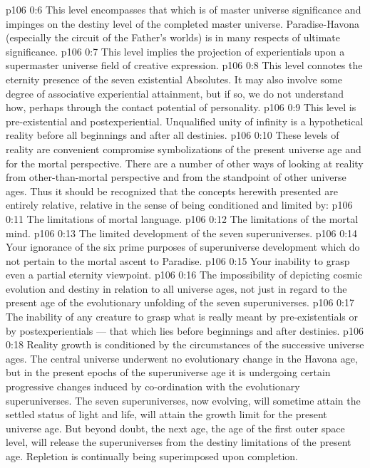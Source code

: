 \vs p106 0:6 \pc {}\bibnobreakspace {} This level encompasses that which is of master universe significance and impinges on the destiny level of the completed master universe. Paradise\hyp{}Havona (especially the circuit of the Father’s worlds) is in many respects of ultimate significance.
\vs p106 0:7 \pc {}\bibnobreakspace {} This level implies the projection of experientials upon a supermaster universe field of creative expression.
\vs p106 0:8 \pc {}\bibnobreakspace {} This level connotes the eternity presence of the seven existential Absolutes. It may also involve some degree of associative experiential attainment, but if so, we do not understand how, perhaps through the contact potential of personality.
\vs p106 0:9 \pc {}\bibnobreakspace {} This level is pre\hyp{}existential and postexperiential. Unqualified unity of infinity is a hypothetical reality before all beginnings and after all destinies.
\vs p106 0:10 \pc These levels of reality are convenient compromise symbolizations of the present universe age and for the mortal perspective. There are a number of other ways of looking at reality from other\hyp{}than\hyp{}mortal perspective and from the standpoint of other universe ages. Thus it should be recognized that the concepts herewith presented are entirely relative, relative in the sense of being conditioned and limited by:
\vs p106 0:11 \pc {}\bibnobreakspace The limitations of mortal language.
\vs p106 0:12 \pc {}\bibnobreakspace The limitations of the mortal mind.
\vs p106 0:13 \pc {}\bibnobreakspace The limited development of the seven superuniverses.
\vs p106 0:14 \pc {}\bibnobreakspace Your ignorance of the six prime purposes of superuniverse development which do not pertain to the mortal ascent to Paradise.
\vs p106 0:15 \pc {}\bibnobreakspace Your inability to grasp even a partial eternity viewpoint.
\vs p106 0:16 \pc {}\bibnobreakspace The impossibility of depicting cosmic evolution and destiny in relation to all universe ages, not just in regard to the present age of the evolutionary unfolding of the seven superuniverses.
\vs p106 0:17 \pc {}\bibnobreakspace The inability of any creature to grasp what is really meant by pre\hyp{}existentials or by postexperientials --- that which lies before beginnings and after destinies.
\vs p106 0:18 \pc Reality growth is conditioned by the circumstances of the successive universe ages. The central universe underwent no evolutionary change in the Havona age, but in the present epochs of the superuniverse age it is undergoing certain progressive changes induced by co\hyp{}ordination with the evolutionary superuniverses. The seven superuniverses, now evolving, will sometime attain the settled status of light and life, will attain the growth limit for the present universe age. But beyond doubt, the next age, the age of the first outer space level, will release the superuniverses from the destiny limitations of the present age. Repletion is continually being superimposed upon completion.
